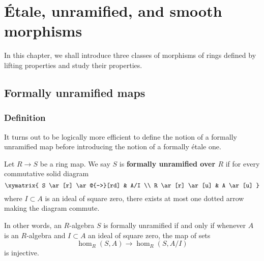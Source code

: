 \chapter{\'Etale, unramified, and smooth morphisms}


In this chapter, we shall introduce three classes of morphisms of rings
defined by lifting properties and study their properties.

\section{Formally unramified maps}
\label{section-formally-unramified}


\subsection{Definition}
It turns out to be logically more efficient to define
the notion of a formally unramified map before introducing
the notion of a formally \'etale one.

\begin{definition}
\label{definition-formally-unramified}
Let $R \to S$ be a ring map.
We say $S$ is {\bf formally unramified over $R$} if for every
commutative solid diagram
\begin{equation} \label{inflift}
\xymatrix{
S \ar[r] \ar@{-->}[rd] & A/I \\
R \ar[r] \ar[u] & A \ar[u]
}
\end{equation}
where $I \subset A$ is an ideal of square zero, there exists
at most one dotted arrow making the diagram commute.
\end{definition}

In other words, an $R$-algebra $S$ is formally unramified if and only if
whenever $A$ is an $R$-algebra and $I \subset A$ an ideal of square zero, the
map of sets
\[ \hom_R(S, A) \to \hom_R(S, A/I)  \]
is injective.


